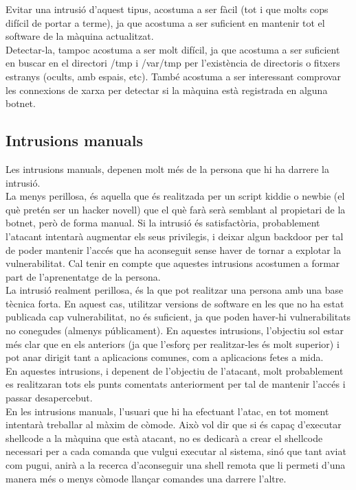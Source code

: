 Evitar una intrusió d'aquest tipus, acostuma a ser fàcil (tot i que molts cops difícil de portar a terme), ja que 
acostuma a ser suficient en mantenir tot el software de la màquina actualitzat. \\

Detectar-la, tampoc acostuma a ser molt difícil, ja que acostuma a ser suficient en buscar en el directori /tmp i /var/tmp
per l'existència de directoris o fitxers estranys (ocults, amb espais, etc). També acostuma a ser interessant comprovar 
les connexions de xarxa per detectar si la màquina està registrada en alguna botnet. \\

\subsection{Intrusions manuals}

Les intrusions manuals, depenen molt més de la persona que hi ha darrere la intrusió. \\

La menys perillosa, és aquella que és realitzada per un script kiddie o newbie (el què pretén ser un hacker novell) que 
el què farà serà semblant al propietari de la botnet, però de forma manual. Si la intrusió és satisfactòria, probablement
l'atacant intentarà augmentar els seus privilegis, i deixar algun backdoor per tal de poder mantenir l'accés que ha aconseguit
sense haver de tornar a explotar la vulnerabilitat. Cal tenir en compte que aquestes intrusions acostumen a formar part
de l'aprenentatge de la persona. \\

La intrusió realment perillosa, és la que pot realitzar una persona amb una base tècnica forta. En aquest cas, utilitzar
versions de software en les que no ha estat publicada cap vulnerabilitat, no és suficient, ja que poden haver-hi vulnerabilitats
no conegudes (almenys públicament). En aquestes intrusions, l'objectiu sol estar més clar que en els anteriors (ja que 
l'esforç per realitzar-les és molt superior) i pot anar dirigit tant a aplicacions comunes, com a aplicacions fetes a mida. \\

En aquestes intrusions, i depenent de l'objectiu de l'atacant, molt probablement es realitzaran tots els punts comentats anteriorment
per tal de mantenir l'accés i passar desapercebut.  \\

En les intrusions manuals, l'usuari que hi ha efectuant l'atac, en tot moment intentarà treballar al màxim de còmode.
Això vol dir que si és capaç d'executar shellcode a la màquina que està atacant, no es dedicarà a crear el shellcode
necessari per a cada comanda que vulgui executar al sistema, sinó que tant aviat com pugui, anirà a la recerca
d'aconseguir una shell remota que li permeti d'una manera més o menys còmode llançar comandes una darrere l'altre. \\

